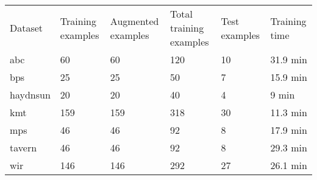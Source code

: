 \begin{tabular}{llllll}
Dataset        & Training examples & Augmented examples & Total training examples & Test examples & Training time \\
\gls{abc}      & 60                & 60                 & 120                     & 10            & 31.9 min      \\
\gls{bps}      & 25                & 25                 & 50                      & 7             & 15.9 min      \\
\gls{haydnsun} & 20                & 20                 & 40                      & 4             & 9 min         \\
\gls{kmt}      & 159               & 159                & 318                     & 30            & 11.3 min      \\
\gls{mps}      & 46                & 46                 & 92                      & 8             & 17.9 min      \\
\gls{tavern}   & 46                & 46                 & 92                      & 8             & 29.3 min      \\
\gls{wir}      & 146               & 146                & 292                     & 27            & 26.1 min     
\end{tabular}

